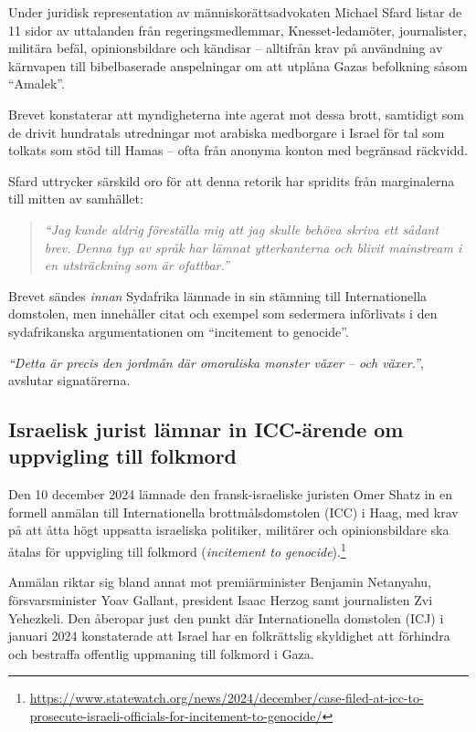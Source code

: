 Under juridisk representation av människorättsadvokaten Michael Sfard listar de 11 sidor av uttalanden från regeringsmedlemmar, Knesset-ledamöter, journalister, militära befäl, opinionsbildare och kändisar – alltifrån krav på användning av kärnvapen till bibelbaserade anspelningar om att utplåna Gazas befolkning såsom “Amalek”.

Brevet konstaterar att myndigheterna inte agerat mot dessa brott, samtidigt som de drivit hundratals utredningar mot arabiska medborgare i Israel för tal som tolkats som stöd till Hamas – ofta från anonyma konton med begränsad räckvidd.

Sfard uttrycker särskild oro för att denna retorik har spridits från marginalerna till mitten av samhället:
\begin{quote}
\textit{“Jag kunde aldrig föreställa mig att jag skulle behöva skriva ett sådant brev. Denna typ av språk har lämnat ytterkanterna och blivit mainstream i en utsträckning som är ofattbar.”}
\end{quote}

Brevet sändes \textit{innan} Sydafrika lämnade in sin stämning till Internationella domstolen, men innehåller citat och exempel som sedermera införlivats i den sydafrikanska argumentationen om “incitement to genocide”.

\textit{“Detta är precis den jordmån där omoraliska monster växer – och växer.”}, avslutar signatärerna.


\subsection{Israelisk jurist lämnar in ICC-ärende om uppvigling till folkmord}

Den 10 december 2024 lämnade den fransk-israeliske juristen Omer Shatz in en formell anmälan till Internationella brottmålsdomstolen (ICC) i Haag, med krav på att åtta högt uppsatta israeliska politiker, militärer och opinionsbildare ska åtalas för uppvigling till folkmord (\textit{incitement to genocide}).\footnote{\url{https://www.statewatch.org/news/2024/december/case-filed-at-icc-to-prosecute-israeli-officials-for-incitement-to-genocide/}}

Anmälan riktar sig bland annat mot premiärminister Benjamin Netanyahu, försvarsminister Yoav Gallant, president Isaac Herzog samt journalisten Zvi Yehezkeli. Den åberopar just den punkt där Internationella domstolen (ICJ) i januari 2024 konstaterade att Israel har en folkrättslig skyldighet att förhindra och bestraffa offentlig uppmaning till folkmord i Gaza.

